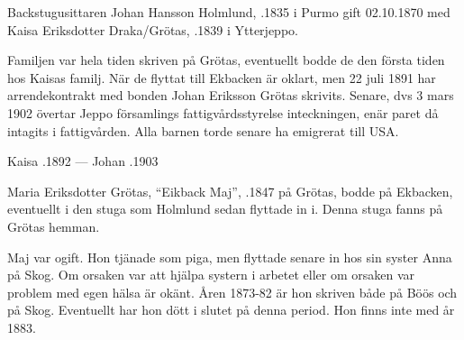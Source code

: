 %
Backstugusittaren Johan Hansson Holmlund, .1835 i Purmo gift 02.10.1870 med Kaisa Eriksdotter Draka/Grötas, .1839  i Ytterjeppo.
\begin{jhchildren}
  \item {}
  \item {}
  \item {}
  \item {}
\end{jhchildren}
Familjen var hela tiden skriven på Grötas, eventuellt bodde de den första tiden hos Kaisas familj. När de flyttat till Ekbacken är oklart, men 22 juli 1891 har arrendekontrakt med bonden Johan Eriksson Grötas  skrivits. Senare, dvs 3 mars 1902 övertar Jeppo församlings fattigvårdsstyrelse inteckningen, enär paret då intagits i fattigvården. Alla barnen torde senare ha emigrerat till USA.

 Kaisa .1892  ---	Johan .1903


%
Maria Eriksdotter Grötas, ``Eikback Maj'', .1847 på Grötas, bodde på Ekbacken, eventuellt i den stuga som Holmlund sedan flyttade in i. Denna stuga fanns på Grötas hemman.

Maj var ogift. Hon tjänade som piga, men flyttade senare in hos sin syster Anna på Skog. Om orsaken var att hjälpa systern i arbetet eller om orsaken var problem med egen hälsa är okänt.  Åren 1873-82 är hon skriven både på Böös och på 	Skog. Eventuellt har hon dött i slutet på denna period. Hon finns inte med år 1883.



%



